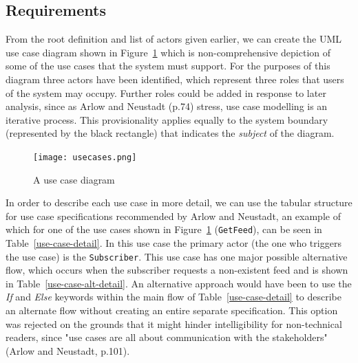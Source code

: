 \documentclass{article}
\begin{document}
\subsection{Requirements}

From the root definition and list of actors given earlier, we can create the UML use case diagram shown in Figure~\ref{use-cases} which is non-comprehensive depiction of some of the use cases that the system must support. For the purposes of this diagram three actors have been identified, which represent three roles that users of the system may occupy. Further roles could be added in response to later analysis, since as Arlow and Neustadt (p.74) stress, use case modelling is an iterative process. This provisionality applies equally to the system boundary (represented by the black rectangle) that indicates the \textit{subject} of the diagram.

\begin{figure}
  \texttt{[image: usecases.png]}
  \caption{A use case diagram}
  \label{use-cases}
\end{figure}

In order to describe each use case in more detail, we can use the tabular structure for use case specifications recommended by Arlow and Neustadt, an example of which for one of the use cases shown in Figure~\ref{use-cases} (\texttt{GetFeed}), can be seen in Table~\ref{use-case-detail}. In this use case the primary actor (the one who triggers the use case) is the \texttt{Subscriber}. This use case has one major possible alternative flow, which occurs when the subscriber requests a non-existent feed and is shown in Table~\ref{use-case-alt-detail}. An alternative approach would have been to use the \textit{If} and \textit{Else} keywords within the main flow of Table~\ref{use-case-detail} to describe an alternate flow without creating an entire separate specification. This option was rejected on the grounds that it might hinder intelligibility for non-technical readers, since "use cases are all about communication with the stakeholders" (Arlow and Neustadt, p.101).

\end{document}
